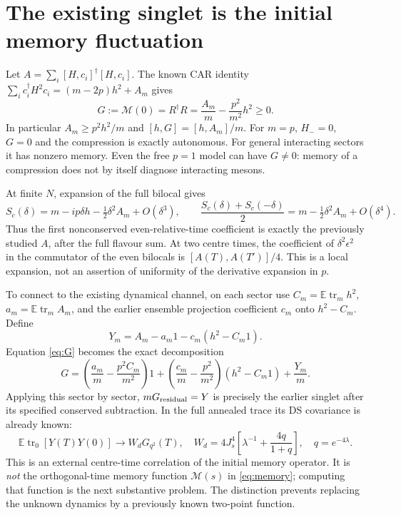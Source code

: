 \documentclass[11pt,a4paper]{article}
\newcommand{\EE}{\mathbb E}
\newcommand{\trm}{\operatorname{tr}_m}
\DeclareMathOperator{\tr}{tr}
\begin{document}
\newpage
\section{The existing singlet is the initial memory fluctuation}
Let $A=\sum_i[H,c_i]^\dagger[H,c_i]$. The known CAR identity
$\sum_i c_i^\dagger H^2c_i=(m-2p)h^2+A_m$ gives
\begin{equation}\label{eq:G}
 G:=\mathcal M(0)=R^\dagger R
 =\frac{A_m}{m}-\frac{p^2}{m^2}h^2\geq0.
\end{equation}
In particular $A_m\geq p^2h^2/m$ and
$[h,G]=[h,A_m]/m$. For $m=p$, $H_-=0$, $G=0$ and the
compression is exactly autonomous. For general interacting sectors
it has nonzero memory. Even the free $p=1$ model can have $G\ne0$:
memory of a compression does not by itself diagnose interacting mesons.

At finite $N$, expansion of the full bilocal gives
\begin{equation}
 S_c(\delta)=m-ip\delta h-\tfrac12\delta^2 A_m+O(\delta^3),
 \qquad
 \frac{S_c(\delta)+S_c(-\delta)}2
 =m-\tfrac12\delta^2 A_m+O(\delta^4).
\end{equation}
Thus the first nonconserved even-relative-time coefficient is exactly
the previously studied $A$, after the full flavour sum. At two centre
times, the coefficient of $\delta^2\epsilon^2$ in the commutator of
the even bilocals is $[A(T),A(T')]/4$. This is a local expansion,
not an assertion of uniformity of the derivative expansion in $p$.

To connect to the existing dynamical channel, on each sector use
$C_m=\EE\trm h^2$, $a_m=\EE\trm A_m$, and the earlier ensemble
projection coefficient $c_m$ onto $h^2-C_m$. Define
\begin{equation}
 Y_m=A_m-a_m1-c_m(h^2-C_m1).
\end{equation}
Equation \eqref{eq:G} becomes the exact decomposition
\begin{equation}\label{eq:decomp}
 G=\left(\frac{a_m}m-\frac{p^2C_m}{m^2}\right)1
 +\left(\frac{c_m}m-\frac{p^2}{m^2}\right)(h^2-C_m1)
 +\frac{Y_m}m.
\end{equation}
Applying this sector by sector, $mG_{\rm residual}=Y$ is precisely
the earlier singlet after its specified conserved subtraction.
In the full annealed trace its DS covariance is already known:
\begin{equation}
 \EE\tr_0[Y(T)Y(0)]\longrightarrow W_dG_{q^2}(T),\quad
 W_d=4J_s^4\left[\lambda^{-1}+\frac{4q}{1+q}\right],\quad
 q=e^{-4\lambda}.
\end{equation}
This is an external centre-time correlation of the initial memory
operator. It is \emph{not} the orthogonal-time memory function
$\mathcal M(s)$ in \eqref{eq:memory}; computing that function is the
next substantive problem. The distinction prevents replacing the
unknown dynamics by a previously known two-point function.
\end{document}
